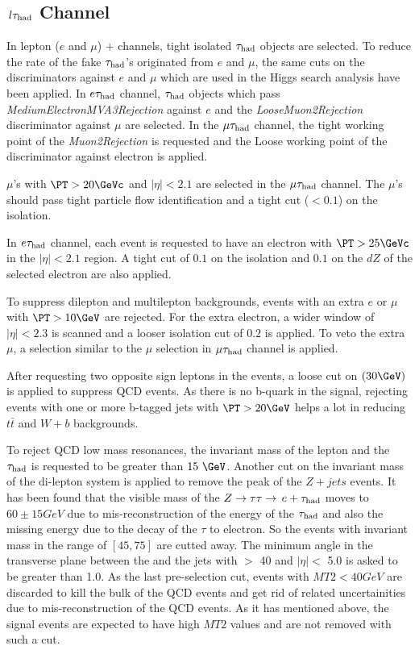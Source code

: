 \subsection{\texorpdfstring{$\,l\tau_{\rm had}$ Channel}{lepton-tau Channel}}
\label{sect:leptonTauCuts}
In lepton ($e$ and $\mu$) $+$ \Tau channels, tight isolated $\tau_{\rm had}$ objects are selected. To reduce the rate of the fake $\tau_{\rm had}$'s originated from $e$ and $\mu$, the same cuts on the discriminators against $e$ and $\mu$ which are used in the Higgs search analysis \cite{CMS_AN_2013-188} have been applied. In $e\tau_{\rm had}$ channel, $\tau_{\rm had}$ objects which pass \emph{MediumElectronMVA3Rejection} against $e$ and the \emph{LooseMuon2Rejection} discriminator against $\mu$ are selected. In the $\mu\tau_{\rm had}$ channel, the tight working point of the \emph{Muon2Rejection} is requested and the Loose working point of the discriminator against electron is applied.

$\mu$'s with $\PT > 20 \GeVc$ and $|\eta|<2.1$ are selected in the $\mu\tau_{\rm had}$ channel. The $\mu$'s should pass tight particle flow identification and a tight cut ($<0.1$) on the isolation.
 
In $e\tau_{\rm had}$ channel, each event is requested to have an electron with $\PT >25 \GeVc$ in the $|\eta| < 2.1 $ region. A tight cut of $0.1$ on the isolation and $0.1$ on the $dZ$ of the selected electron are also applied.

To suppress dilepton and multilepton backgrounds, events with an extra $e$ or $\mu$ with $\PT >10 \GeV$ are rejected. For the extra electron, a wider window of $|\eta|<2.3$ is scanned and a looser isolation cut of $0.2$ is applied. To veto the extra $\mu$, a selection similar to the $\mu$ selection in $\mu\tau_{\rm had}$ channel is applied.

After requesting two opposite sign leptons in the events, a loose cut on \MET $(30 \GeV)$ is applied to suppress QCD events. As there is no b-quark in the signal, rejecting events with one or more b-tagged jets with $\PT > 20 \GeV$ helps a lot in reducing $t\bar{t}$ and $W+b$ backgrounds.

To reject QCD low mass resonances, the invariant mass of the lepton and the $\tau_{\rm had}$ is requested to be greater than $15\ \GeV$. Another cut on the invariant mass of the di-lepton system is applied to remove the peak of the $Z+jets$ events. It has been found that the visible mass of the $Z\to\tau\tau\to\,e +\tau_{\rm had}$ moves to $60 \pm 15 GeV$ due to mis-reconstruction of the energy of the $\tau_{\rm had}$ and also the missing energy due to the decay of the $\tau$ to electron. So the events with invariant mass in the range of $[45,75]$ are cutted away. The minimum angle in the transverse plane between the \MET and the jets with \PT $>$ 40 \GeVc and $|\eta| <$ 5.0 is asked to be greater than 1.0. As the last pre-selection cut, events with $MT2<40 GeV$ are discarded to kill the bulk of the QCD events and get rid of related uncertainities due to mis-reconstruction of the QCD events. As it has mentioned above, the signal events are expected to have high $MT2$ values and are not removed with such a cut.

